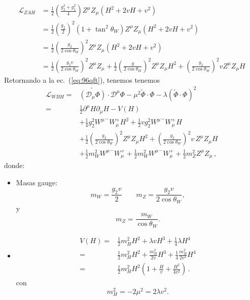 \begin{frame}
\begin{align}
  \mathcal{L}_{ZAH}&=\frac{1}{2}\left(\frac{g_2^2+g_1^2}{4}\right)Z^\mu Z_\mu
  \left(H^2+2vH+v^2\right)\nonumber\\
  &=\frac{1}{2}\left(\frac{g_2}{2}\right)^2\left(1+\tan^2\theta_W\right)Z^\mu Z_\mu\left(H^2+2vH+v^2\right)\nonumber\\
  &=\frac{1}{2}\left(\frac{g_2}{2\cos\theta_W}\right)^2Z^\mu Z_\mu\left(H^2+2vH+v^2\right)\nonumber\\
  &=\frac{1}{2}\left(\frac{g_2v}{2\cos\theta_W}\right)^2Z^\mu Z_\mu+\frac{1}{2}\left(\frac{g}{2\cos\theta_W}\right)^2Z^\mu Z_\mu H^2
  +\left(\frac{g_2}{2\cos\theta_W}\right)^2vZ^\mu Z_\mu H
\end{align}
Retornando a la ec.~(\ref{eq:96qft}), tenemos
tenemos
\begin{align}
  \label{eq:lwbhfin}
  \mathcal{L}_{W B H}=&\widetilde{\left( \mathcal{D}_\mu{\Phi} \right)}\cdot\mathcal{D}^\mu\Phi-\mu^2\widetilde{\Phi}\cdot\Phi-\lambda \left( \widetilde{\Phi}\cdot\Phi \right)^2 \nonumber\\
  =&\frac{1}{2}\partial^\mu H\partial_\mu H-V(H)\nonumber\\
&+\frac{1}{4}g_2^2{W^\mu}^-W_\mu^+H^2+\frac{1}{2}vg_2^2{W^\mu}^-W_\mu^+H\nonumber\\
  &+\frac{1}{2}\left(\frac{g_2}{2\cos\theta_W}\right)^2Z^\mu Z_\mu H^2+\left(\frac{g_2}{2\cos\theta_W}\right)^2v\,Z^\mu Z_\mu H\nonumber\\
  &+\frac{1}{2}m_W^2{W^\mu}^-W_\mu^++\frac{1}{2}m_W^2{W^\mu}^-W_\mu^+ +\frac{1}{2}m_Z^2Z^\mu Z_\mu\,,
\end{align}
donde:
\begin{itemize} %
\item Masas gauge:
\begin{equation}
\label{eq:mwz}
  m_W=\frac{g_2v}{2}
  \qquad 
  m_Z=\frac{g_2v}{2\cos\theta_W},
\end{equation}
y
\begin{equation}
\label{eq:mwzw}
  m_Z=\frac{m_W}{\cos\theta_W}.
\end{equation}
\item
  \begin{align}
    V(H)=&\tfrac{1}{2}m_H^2H^2+\lambda vH^3+\tfrac{1}{4}\lambda H^4\nonumber\\
    =&\frac{1}{2}m_H^2H^2+\frac{m_H^2}{2v}H^3+\frac{1}{4}\frac{m_H^2}{2v^2} H^4\nonumber\\
    =&\frac{1}{2}m_H^2H^2\left(1+\frac{H}{v}+\frac{H^2}{4v^2}\right)\,.
  \end{align}
con
\begin{equation}
  m_H^2=-2\mu^2=2\lambda v^2.
\end{equation}


\end{itemize}
\end{frame}
